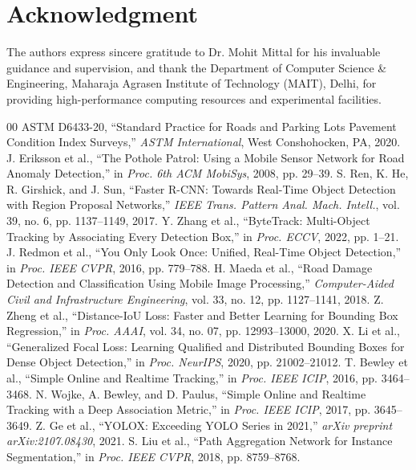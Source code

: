 \documentclass[conference]{IEEEtran}
\begin{document}
\section*{Acknowledgment}
The authors express sincere gratitude to Dr. Mohit Mittal for his invaluable guidance and supervision, and thank the Department of Computer Science \& Engineering, Maharaja Agrasen Institute of Technology (MAIT), Delhi, for providing high-performance computing resources and experimental facilities.

\begin{thebibliography}{00}
 ASTM D6433-20, ``Standard Practice for Roads and Parking Lots Pavement Condition Index Surveys,'' \textit{ASTM International}, West Conshohocken, PA, 2020.
 J. Eriksson et al., ``The Pothole Patrol: Using a Mobile Sensor Network for Road Anomaly Detection,'' in \textit{Proc. 6th ACM MobiSys}, 2008, pp. 29--39.
 S. Ren, K. He, R. Girshick, and J. Sun, ``Faster R-CNN: Towards Real-Time Object Detection with Region Proposal Networks,'' \textit{IEEE Trans. Pattern Anal. Mach. Intell.}, vol. 39, no. 6, pp. 1137--1149, 2017.
 Y. Zhang et al., ``ByteTrack: Multi-Object Tracking by Associating Every Detection Box,'' in \textit{Proc. ECCV}, 2022, pp. 1--21.
 J. Redmon et al., ``You Only Look Once: Unified, Real-Time Object Detection,'' in \textit{Proc. IEEE CVPR}, 2016, pp. 779--788.
 H. Maeda et al., ``Road Damage Detection and Classification Using Mobile Image Processing,'' \textit{Computer-Aided Civil and Infrastructure Engineering}, vol. 33, no. 12, pp. 1127--1141, 2018.
 Z. Zheng et al., ``Distance-IoU Loss: Faster and Better Learning for Bounding Box Regression,'' in \textit{Proc. AAAI}, vol. 34, no. 07, pp. 12993--13000, 2020.
 X. Li et al., ``Generalized Focal Loss: Learning Qualified and Distributed Bounding Boxes for Dense Object Detection,'' in \textit{Proc. NeurIPS}, 2020, pp. 21002--21012.
 T. Bewley et al., ``Simple Online and Realtime Tracking,'' in \textit{Proc. IEEE ICIP}, 2016, pp. 3464--3468.
 N. Wojke, A. Bewley, and D. Paulus, ``Simple Online and Realtime Tracking with a Deep Association Metric,'' in \textit{Proc. IEEE ICIP}, 2017, pp. 3645--3649.
 Z. Ge et al., ``YOLOX: Exceeding YOLO Series in 2021,'' \textit{arXiv preprint arXiv:2107.08430}, 2021.
 S. Liu et al., ``Path Aggregation Network for Instance Segmentation,'' in \textit{Proc. IEEE CVPR}, 2018, pp. 8759--8768.

\end{thebibliography}
\end{document}
